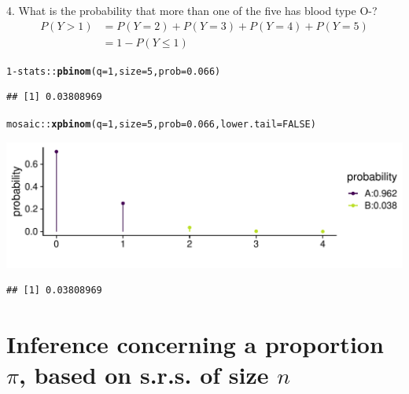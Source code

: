 \documentclass[10pt,handout]{beamer}\usepackage[]{graphicx}\usepackage[]{color}
\makeatletter
\def\maxwidth{ %
  \ifdim\Gin@nat@width>\linewidth
    \linewidth
  \else
    \Gin@nat@width
  \fi
}
\newcommand{\hlnum}[1]{\textcolor[rgb]{0.686,0.059,0.569}{#1}}%
\newcommand{\hlopt}[1]{\textcolor[rgb]{0,0,0}{#1}}%
\newcommand{\hlstd}[1]{\textcolor[rgb]{0.345,0.345,0.345}{#1}}%
\newcommand{\hlkwc}[1]{\textcolor[rgb]{0.333,0.667,0.333}{#1}}%
\newcommand{\hlkwd}[1]{\textcolor[rgb]{0.737,0.353,0.396}{\textbf{#1}}}%
\newenvironment{kframe}{%
 \def\at@end@of@kframe{}%
 \ifinner\ifhmode%
  \def\at@end@of@kframe{\end{minipage}}%
  \begin{minipage}{\columnwidth}%
 \fi\fi%
 \def\FrameCommand##1{\hskip\@totalleftmargin \hskip-\fboxsep
 \colorbox{shadecolor}{##1}\hskip-\fboxsep
     \hskip-\linewidth \hskip-\@totalleftmargin \hskip\columnwidth}%
 \MakeFramed {\advance\hsize-\width
   \@totalleftmargin\z@ \linewidth\hsize
   \@setminipage}}%
 {\par\unskip\endMakeFramed%
 \at@end@of@kframe}
\newenvironment{knitrout}{}{} %
\makeatother
\begin{document}
\begin{frame}[fragile]{4. What is the probability that more than one of the five has blood type O-?}
	\footnotesize
	\begin{align*}
	P(Y > 1) & = P(Y = 2) + P(Y = 3) + P(Y=4) + P(Y=5) \\
	& = 1 - P(Y \leq 1)
	\end{align*}
	
	
\begin{knitrout}\tiny
{}\color{fgcolor}\begin{kframe}
\begin{alltt}
\hlnum{1} \hlopt{-} \hlstd{stats}\hlopt{::}\hlkwd{pbinom}\hlstd{(}\hlkwc{q} \hlstd{=} \hlnum{1}\hlstd{,} \hlkwc{size} \hlstd{=} \hlnum{5}\hlstd{,} \hlkwc{prob} \hlstd{=} \hlnum{0.066}\hlstd{)}
\end{alltt}
\begin{verbatim}
## [1] 0.03808969
\end{verbatim}
\begin{alltt}
\hlstd{mosaic}\hlopt{::}\hlkwd{xpbinom}\hlstd{(}\hlkwc{q} \hlstd{=} \hlnum{1}\hlstd{,} \hlkwc{size} \hlstd{=} \hlnum{5}\hlstd{,} \hlkwc{prob} \hlstd{=} \hlnum{0.066}\hlstd{,} \hlkwc{lower.tail} \hlstd{=} \hlnum{FALSE}\hlstd{)}
\end{alltt}
\end{kframe}

{\centering \includegraphics[width=\maxwidth]{figure/unnamed-chunk-13-1} 

}


\begin{kframe}\begin{verbatim}
## [1] 0.03808969
\end{verbatim}
\end{kframe}
\end{knitrout}
	
\end{frame}



\section{Inference concerning a proportion $\pi$, based on s.r.s. of size $n$}
\end{document}
